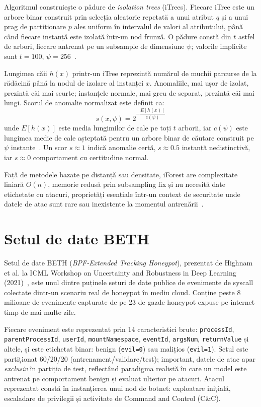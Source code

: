 Algoritmul construiește o pădure de \textit{isolation trees} (iTrees). Fiecare iTree este un
arbore binar construit prin selecția aleatorie repetată a unui atribut $q$ și a unui prag de
partiționare $p$ ales uniform în intervalul de valori al atributului, până când fiecare instanță
este izolată într-un nod frunză. O pădure constă din $t$ astfel de arbori, fiecare antrenat
pe un subsample de dimensiune $\psi$; valorile implicite sunt $t = 100$, $\psi = 256$~\cite{liu2008iforest}.

Lungimea căii $h(x)$ printr-un iTree reprezintă numărul de muchii parcurse de la rădăcină până
la nodul de izolare al instanței $x$. Anomaliile, mai ușor de izolat, prezintă căi mai scurte;
instanțele normale, mai greu de separat, prezintă căi mai lungi. Scorul de anomalie normalizat
este definit ca:
\[
    s(x, \psi) = 2^{-\dfrac{E[h(x)]}{c(\psi)}}
\]
unde $E[h(x)]$ este media lungimilor de cale pe toți $t$ arborii, iar $c(\psi)$ este lungimea
medie de cale așteptată pentru un arbore binar de căutare construit pe $\psi$
instanțe~\cite{liu2012isolation}. Un scor $s \approx 1$ indică anomalie certă, $s \approx 0.5$
instanță nedistinctivă, iar $s \approx 0$ comportament cu certitudine normal.

Față de metodele bazate pe distanță sau densitate, iForest are complexitate liniară $O(n)$,
memorie redusă prin subsampling fix și nu necesită date etichetate cu atacuri, proprietăți
esențiale într-un context de securitate unde datele de atac sunt rare sau inexistente la
momentul antrenării~\cite{liu2008iforest,liu2012isolation}.

\section{Setul de date BETH}

Setul de date BETH (\textit{BPF-Extended Tracking Honeypot}), prezentat de Highnam et al. la
ICML Workshop on Uncertainty and Robustness in Deep Learning (2021)~\cite{highnam2021beth}, este
unul dintre puținele seturi de date publice de evenimente de syscall colectate dintr-un scenariu
real de honeypot în mediu cloud. Conține peste 8 milioane de evenimente capturate de pe 23 de
gazde honeypot expuse pe internet timp de mai multe zile.

Fiecare eveniment este reprezentat prin 14 caracteristici brute: \texttt{processId},
\texttt{parentProcessId}, \texttt{userId}, \texttt{mountNamespace}, \texttt{eventId},
\texttt{argsNum}, \texttt{returnValue} și altele, și este etichetat binar: benign (\texttt{evil=0})
sau malițios (\texttt{evil=1}). Setul este partiționat 60/20/20 (antrenament/validare/test);
important, datele de atac apar \textit{exclusiv} în partiția de test, reflectând paradigma
realistă în care un model este antrenat pe comportament benign și evaluat ulterior pe atacuri.
Atacul reprezentat constă în instanțierea unui nod de botnet: exploatare inițială, escaladare
de privilegii și activitate de Command and Control (C\&C).

